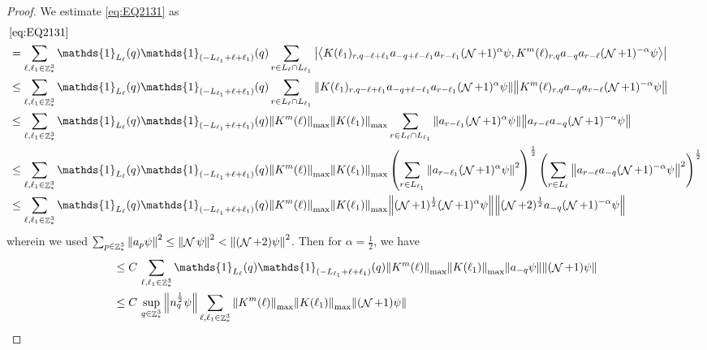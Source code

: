 \documentclass[sn-mathphys, Numbered ,a4paper]{sn-jnl}%
\DeclareMathOperator{\Z}{\mathbb{Z}}
\DeclareMathOperator{\NN}{\mathcal{N}}
\newcommand{\half}{\frac{1}{2}}
\newcommand{\eva}[1]{\left\langle #1 \right\rangle}
\theoremstyle{plain}
\theoremstyle{definition}
\theoremstyle{remark}
\theoremstyle{plain}
\theoremstyle{definition}
\theoremstyle{remark}
\begin{document}
\begin{proof}
We estimate \eqref{eq:EQ2131} as
\begin{align}
    &\eqref{eq:EQ2131}\nonumber\\
    &= \sum\limits_{\ell, \ell_1\in \Z^3_*} \mathds{1}_{L_{\ell}}(q) \mathds{1}_{(-L_{\ell_1}+\ell+\ell_1)}(q) \sum\limits_{r\in L_{\ell} \cap L_{\ell_1}} \abs{\eva{ K(\ell_1)_{r,q-\ell+\ell_1} a_{-q+\ell-\ell_1} a_{r-\ell_1}(\NN+1)^{\alpha}\psi, K^m(\ell)_{r,q} a_{-q}a_{r-\ell} (\NN+1)^{-\alpha} \psi }}\nonumber\\
    &\leq \sum\limits_{\ell, \ell_1\in \Z^3_*} \mathds{1}_{L_{\ell}}(q) \mathds{1}_{(-L_{\ell_1}+\ell+\ell_1)}(q) \sum\limits_{r\in L_{\ell} \cap L_{\ell_1}} \norm{ K(\ell_1)_{r,q-\ell+\ell_1} a_{-q+\ell-\ell_1} a_{r-\ell_1}(\NN+1)^{\alpha}\psi}\norm{ K^m(\ell)_{r,q} a_{-q}a_{r-\ell} (\NN+1)^{-\alpha} \psi }\nonumber\\
    &\leq \sum\limits_{\ell, \ell_1\in \Z^3_*} \mathds{1}_{L_{\ell}}(q) \mathds{1}_{(-L_{\ell_1}+\ell+\ell_1)}(q)  \norm{K^m(\ell)}_{\mathrm{max}} \norm{ K(\ell_1)}_{\mathrm{max}}\sum\limits_{r\in L_{\ell} \cap L_{\ell_1}} \norm{ a_{r-\ell_1}(\NN+1)^{\alpha}\psi}\norm{ a_{r-\ell} a_{-q} (\NN+1)^{-\alpha} \psi }\nonumber\\
    &\leq \sum\limits_{\ell, \ell_1\in \Z^3_*} \mathds{1}_{L_{\ell}}(q) \mathds{1}_{(-L_{\ell_1}+\ell+\ell_1)}(q)  \norm{K^m(\ell)}_{\mathrm{max}} \norm{ K(\ell_1)}_{\mathrm{max}}\left(\sum\limits_{r\in L_{\ell_1}} \norm{ a_{r-\ell_1} (\NN+1)^{\alpha} \psi}^2\right)^\half\left( \sum\limits_{r\in L_{\ell} } \norm{ a_{r-\ell} a_{-q} (\NN+1)^{-\alpha} \psi }^2\right)^\half\nonumber\\
    &\leq \sum\limits_{\ell, \ell_1\in \Z^3_*} \mathds{1}_{L_{\ell}}(q) \mathds{1}_{(-L_{\ell_1}+\ell+\ell_1)}(q)  \norm{K^m(\ell)}_{\mathrm{max}} \norm{ K(\ell_1)}_{\mathrm{max}} \norm{ (\NN+1)^\half(\NN+1)^{\alpha} \psi} \norm{ (\NN+2)^\half a_{-q} (\NN+1)^{-\alpha} \psi }\nonumber
\end{align} 
wherein we used $\sum_{p\in \Z^3_*}\norm{a_p \psi}^2\leq\norm{\NN\psi}^2<\norm{(\NN+2)\psi}^2$. Then for $\alpha =  \half $, we have 
\begin{align}
	&\leq C\,\sum\limits_{\ell, \ell_1\in \Z^3_*} \mathds{1}_{L_{\ell}}(q) \mathds{1}_{(-L_{\ell_1}+\ell+\ell_1)}(q)  \norm{K^m(\ell)}_{\mathrm{max}} \norm{ K(\ell_1)}_{\mathrm{max}}  \norm{a_{-q} \psi } \norm{ (\NN+1) \psi} \nonumber\\
	&\leq C\, \sup\limits_{q\in \Z^3_*}\norm{n_q^\half \psi } \sum\limits_{\ell, \ell_1\in \Z^3_*}   \norm{K^m(\ell)}_{\mathrm{max}} \norm{ K(\ell_1)}_{\mathrm{max}}   \norm{ (\NN+1) \psi} \nonumber\\

\end{align}
\end{proof}
\end{document}
